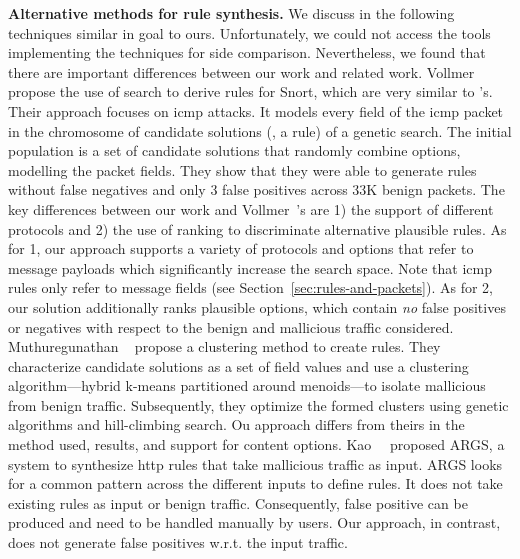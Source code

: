 \documentclass[sigconf,review, anonymous]{acmart}
\begin{document}
\noindent
\textbf{Alternative methods for rule synthesis.} We discuss in the
following techniques similar in goal to ours. Unfortunately, we could
not access the tools implementing the techniques for side
comparison. Nevertheless, we found that there are important
differences between our work and related work. Vollmer
\etal{}~\cite{vollmer-etal-cics2011} propose the use of search to
derive rules for Snort, which are very similar to \suri's.  Their
approach focuses on icmp attacks. It models every field of the icmp
packet in the chromosome of candidate solutions (\ie{}, a rule) of a
genetic search. The initial population is a set of candidate solutions
that randomly combine options, modelling the packet fields. They show
that they were able to generate rules without false negatives and only
3 false positives across 33K benign packets. The key differences
between our work and Vollmer~\etal{}'s are 1) the support of different
protocols and 2) the use of ranking to discriminate alternative
plausible rules. As for 1, our approach supports a variety of
protocols and options that refer to message payloads which
significantly increase the search space. Note that icmp rules only
refer to message fields (see Section~\ref{sec:rules-and-packets}). As
for 2, our solution additionally ranks plausible options, which
contain \emph{no} false positives or negatives with respect to the
benign and mallicious traffic considered. Muthuregunathan
\etal{}~\cite{muthuregunathan-etal2009} propose a clustering method to
create rules. They characterize candidate solutions as a set of field
values and use a clustering algorithm---hybrid k-means partitioned
around menoids---to isolate mallicious from benign
traffic. Subsequently, they optimize the formed clusters using genetic
algorithms and hill-climbing search. Ou approach differs from theirs
in the method used, results, and support for content
options. Kao~\etal~\cite{Kao2015AutomaticNR} proposed ARGS, a system
to synthesize http rules that take mallicious traffic as input. ARGS
looks for a common pattern across the different inputs to define
rules. It does not take existing rules as input or benign
traffic. Consequently, false positive can be produced and need to be
handled manually by users. Our approach, in contrast, does not
generate false positives w.r.t. the input traffic.

\end{document}
